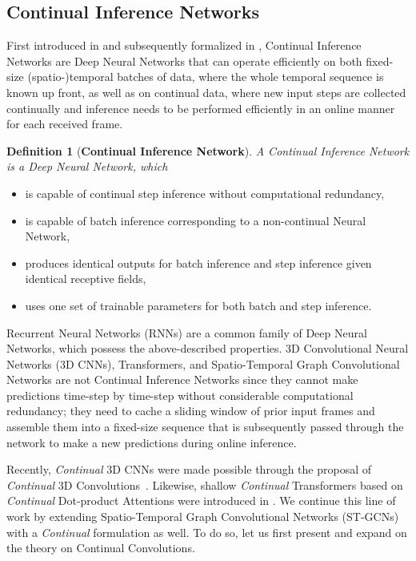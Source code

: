 \documentclass[journal]{IEEEtran}
\theoremstyle{definition}
\newtheorem*{definition}{Definition}
\begin{document}
\subsection{Continual Inference Networks}\label{sec:continual}
First introduced in \cite{hedegaard2021continual} and subsequently formalized in \cite{hedegaard2022cotrans}, Continual Inference Networks are Deep Neural Networks that can operate efficiently on both fixed-size (spatio-)temporal batches of data, where the whole temporal sequence is known up front, as well as on continual data, where new input steps are collected continually and inference needs to be performed efficiently in an online manner for each received frame.
\begin{definition}[\textbf{Continual Inference Network}]
\itshape
A Continual Inference Network is a Deep Neural Network, which
\begin{itemize}
    \item is capable of continual step inference without computational redundancy,
    \item is capable of batch inference corresponding to a non-continual Neural Network,
    \item produces identical outputs for batch inference and step inference given identical receptive fields,
    \item uses one set of trainable parameters for both batch and step inference.
\end{itemize}
\end{definition}
Recurrent Neural Networks (RNNs) are a common family of Deep Neural Networks, which possess the above-described properties. 
3D Convolutional Neural Networks (3D CNNs), Transformers, and Spatio-Temporal Graph Convolutional Networks are not Continual Inference Networks since they cannot make predictions time-step by time-step without considerable computational redundancy; 
they need to cache a sliding window of prior input frames and assemble them into a fixed-size sequence that is subsequently passed through the network to make a new predictions during online inference. 

Recently, \textit{Continual} 3D CNNs were made possible through the proposal of \textit{Continual} 3D Convolutions~\cite{hedegaard2021continual}. 
Likewise, shallow \textit{Continual} Transformers based on \textit{Continual} Dot-product Attentions were introduced in \cite{hedegaard2022cotrans}.
We continue this line of work by extending Spatio-Temporal Graph Convolutional Networks (ST-GCNs) with a \textit{Continual} formulation as well.
To do so, let us first present and expand on the theory on Continual Convolutions.
\end{document}
